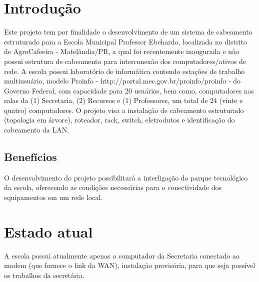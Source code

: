 \documentclass[	DIV=calc,%
							paper=a4,%
							fontsize=12pt,%
							onecolumn]{scrartcl}	 					%
\begin{document}
\clearpage
\renewcommand{\contentsname}{Sumário}
\tableofcontents
\clearpage

\section{Introdução}
Este projeto tem por finalidade o desenvolvimento de um sistema de cabeamento estruturado para a Escola Municipal Professor Ebehardo, localizada no distrito de AgroCafeeira - Matelândia/PR, a qual foi recentemente inaugurada e não possui estrutura de cabeamento para interconexão dos computadores/ativos de rede.
A escola possui laboratório de informática contendo estações de trabalho multiusuário, modelo Proinfo - http://portal.mec.gov.br/proinfo/proinfo - do Governo Federal, com capacidade para 20 usuários, bem como, computadores nas salas da (1) Secretaria, (2) Recursos e (1) Professores, um total de 24 (vinte e quatro) computadores.
O projeto visa a instalação de cabeamento estruturado (topologia em árvore), roteador, rack, switch, eletrodutos e identificação do cabeamento da LAN. 


\subsection{Benefícios}
O desenvolvimento do projeto possibilitará a interligação do parque tecnológico da escola, oferecendo as condições necessárias para o conectividade dos equipamentos em um rede local.

\section{Estado atual}
A escola possui atualmente apenas o computador da Secretaria conectado ao modem (que fornece o link da WAN), instalação provisória, para que seja possível os trabalhos da secretária.
\end{document}

